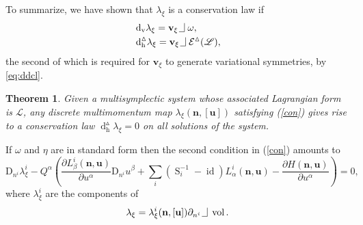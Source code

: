 \documentclass[11pt]{article} %
\numberwithin{equation}{section}
\newcommand{\intpsym}{\,\, \setlength{\unitlength}{0.4mm}
	\begin{picture}(0, 0)(5, 5)%
	\put(0, 4){\line(1,0){5}} \put(5,4){\line(0,1){8}}
	\end{picture}\,\,}
\newcommand{\intp}{\,\,\intpsym}
\newcommand{\es}{\operatorname{S}}
\newcommand{\id}{\operatorname{id}}
\newcommand{\volf}{\operatorname{vol}}
\newcommand{\upd}{\operatorname{d}}
\newcommand{\uph}{\operatorname{h}}
\newcommand{\upv}{\operatorname{v}}
\newcommand{\dv}{\upd_{\upv}\!}
\newcommand{\diffi}{\mathrm{D}_{n^i}}
\newcommand{\mbn}{\mathbf{n}}
\newcommand{\mbu}{\mathbf{u}}
\newcommand{\mbv}{\mathbf{v}}
\newcommand{\mcE}{\mathcal{E}}
\newcommand{\msL}{\mathscr{L}}
\newcommand{\dDh}{\upd^{\vartriangle}_{\uph}}
\theoremstyle{plain}
\newtheorem{thm}{Theorem}[section]
\theoremstyle{definition}
\begin{document}
To summarize, we have shown that $\lambda_{\xi}$ is a conservation law if
\begin{equation}
\begin{aligned}
\label{con}
&\dv \lambda_{\xi}=\mbv_{\xi}\intp\omega,\\
&\dDh\!\lambda_{\xi}=\mbv_{\xi}\intp\mcE^{\vartriangle}(\msL),
\end{aligned}
\end{equation}
the second of which is required for $\mbv_{\xi}$ to generate variational symmetries, by \eqref{eq:ddcl}.
\begin{thm}
Given a multisymplectic system whose associated Lagrangian form is $\msL$, any discrete
multimomentum map $\lambda_{\xi}(\mbn,[\mbu])$ satisfying
(\ref{con}) gives rise to a conservation law
$\dDh\!\lambda_{\xi}=0$
on all solutions of the system.
\end{thm}
If $\omega$ and $\eta$ are in standard form then 
the second condition in (\ref{con}) amounts to
\begin{equation}
\label{cll} 
\diffi \lambda_{\xi}^i-Q^{\alpha}
\left(\frac{\partial L_{\beta}^i(\mbn,\mbu)}{\partial
u^{\alpha}}\diffi u^{\beta}
+\sum_i(\es_i^{-1}-\id)L_{\alpha}^i(\mbn,\mbu)-\frac{\partial
H(\mbn,\mbu)}{\partial u^{\alpha}}\right)=0,
\end{equation}
where $\lambda_{\xi}^i$ are the components of
\begin{equation}
\lambda_{\xi}=\lambda_{\xi}^i(\mbn,[\mbu])\partial_{n^i}\intp\volf.
\end{equation}
\end{document}

